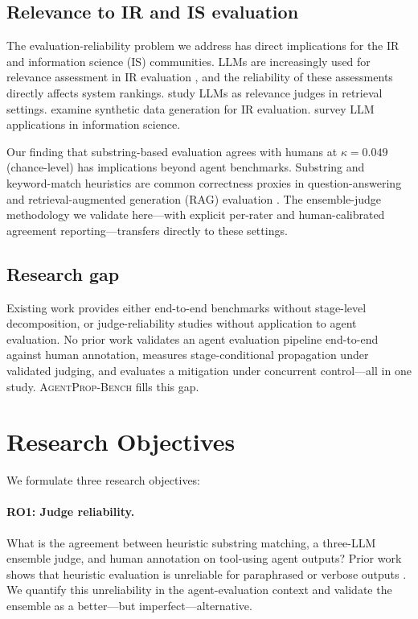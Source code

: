 \documentclass{article}
\newcommand{\bench}{\textsc{AgentProp-Bench}\xspace}
\begin{document}
\subsection{Relevance to IR and IS evaluation}

The evaluation-reliability problem we address has direct implications
for the IR and information science (IS) communities.
LLMs are increasingly used for relevance assessment in IR evaluation
\citep{balog2025rankers}, and the reliability of these
assessments directly affects system rankings.
\citep{salemi2024retrieval} study LLMs as relevance judges in retrieval
settings.
\citep{rahmani2024synthetic} examine synthetic data generation for IR
evaluation.
\citep{zhu2024llmir} survey LLM applications in information science.

Our finding that substring-based evaluation agrees with humans at
$\kappa{=}0.049$ (chance-level) has implications beyond agent
benchmarks.
Substring and keyword-match heuristics are common correctness proxies in
question-answering and retrieval-augmented generation (RAG) evaluation
\citep{es2024ragas,niu2024ragtruth}.
The ensemble-judge methodology we validate here---with explicit
per-rater and human-calibrated agreement reporting---transfers directly
to these settings.

\subsection{Research gap}

Existing work provides either end-to-end benchmarks without stage-level
decomposition, or judge-reliability studies without application to agent
evaluation.
No prior work validates an agent evaluation pipeline end-to-end against
human annotation, measures stage-conditional propagation under validated
judging, and evaluates a mitigation under concurrent control---all in
one study.
\bench{} fills this gap.


\section{Research Objectives}
\label{sec:ro}

We formulate three research objectives:

\paragraph{RO1: Judge reliability.}
What is the agreement between heuristic substring matching, a
three-LLM ensemble judge, and human annotation on tool-using agent
outputs?
Prior work shows that heuristic evaluation is unreliable for
paraphrased or verbose outputs \citep{soboroff2024dont}.
We quantify this unreliability in the agent-evaluation context and
validate the ensemble as a better---but imperfect---alternative.
\end{document}
